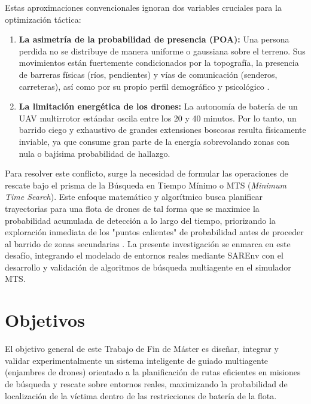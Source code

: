 Estas aproximaciones convencionales ignoran dos variables cruciales para la optimización táctica:
\begin{enumerate}
    \item \textbf{La asimetría de la probabilidad de presencia (POA):} Una persona perdida no se distribuye de manera uniforme o gaussiana sobre el terreno. Sus movimientos están fuertemente condicionados por la topografía, la presencia de barreras físicas (ríos, pendientes) y vías de comunicación (senderos, carreteras), así como por su propio perfil demográfico y psicológico \cite{koester2008}.
    \item \textbf{La limitación energética de los drones:} La autonomía de batería de un UAV multirrotor estándar oscila entre los 20 y 40 minutos. Por lo tanto, un barrido ciego y exhaustivo de grandes extensiones boscosas resulta físicamente inviable, ya que consume gran parte de la energía sobrevolando zonas con nula o bajísima probabilidad de hallazgo.
\end{enumerate}

Para resolver este conflicto, surge la necesidad de formular las operaciones de rescate bajo el prisma de la Búsqueda en Tiempo Mínimo o MTS (\textit{Minimum Time Search}). Este enfoque matemático y algorítmico busca planificar trayectorias para una flota de drones de tal forma que se maximice la probabilidad acumulada de detección a lo largo del tiempo, priorizando la exploración inmediata de los "puntos calientes" de probabilidad antes de proceder al barrido de zonas secundarias \cite{lanillos-bayesian}. La presente investigación se enmarca en este desafío, integrando el modelado de entornos reales mediante SAREnv \cite{Grøntved} con el desarrollo y validación de algoritmos de búsqueda multiagente en el simulador MTS.

\section{Objetivos}
El objetivo general de este Trabajo de Fin de Máster es diseñar, integrar y validar experimentalmente un sistema inteligente de guiado multiagente (enjambres de drones) orientado a la planificación de rutas eficientes en misiones de búsqueda y rescate sobre entornos reales, maximizando la probabilidad de localización de la víctima dentro de las restricciones de batería de la flota.

